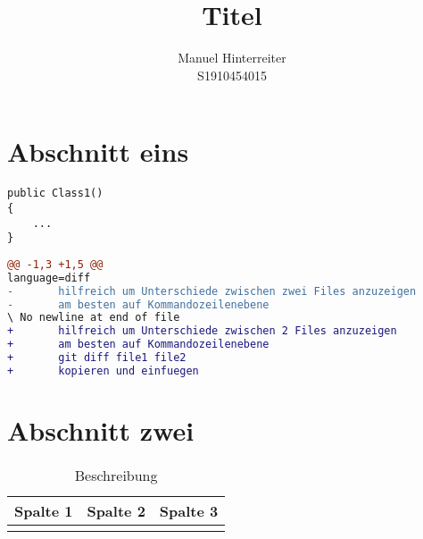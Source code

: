 \documentclass[12pt]{article}
\title{Titel} %
\author{Manuel Hinterreiter\\S1910454015}
\begin{document}
%
\maketitle

\tableofcontents
\newpage
\section{Abschnitt eins}
\begin{lstlisting}[caption=Class1.cs]
public Class1()
{
    ...
}
\end{lstlisting}

\begin{lstlisting}[language=diff, caption=Diff.cs]
@@ -1,3 +1,5 @@
language=diff
-       hilfreich um Unterschiede zwischen zwei Files anzuzeigen
-       am besten auf Kommandozeilenebene
\ No newline at end of file
+       hilfreich um Unterschiede zwischen 2 Files anzuzeigen
+       am besten auf Kommandozeilenebene
+       git diff file1 file2
+       kopieren und einfuegen
\end{lstlisting}

\section{Abschnitt zwei}
\begin{table}[h!]
  \centering
  \begin{tabular}{|p{2.5cm}||p{4cm}|p{4cm}|}
    \hline
     \textbf{Spalte 1} & \textbf{Spalte 2} & \textbf{Spalte 3} \\
     \hline
     &&\\
     \hline
   \end{tabular}
   \caption{Beschreibung}
   \label{tab:table1}
\end{table}
\end{document}
